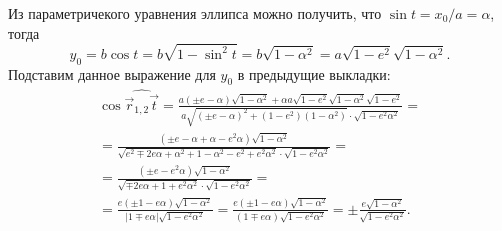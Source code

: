 Из параметричекого уравнения эллипса можно получить, что $\sin t = x_0/a = \alpha$, тогда
\begin{equation*}
	y_0 = b \cos t = b \sqrt{1 - \sin^2 t} = b \sqrt{1 - \alpha^2} = a \sqrt{1 - e^2} \sqrt{1 - \alpha^2}.
\end{equation*}
Подставим данное выражение для $y_0$ в предыдущие выкладки:
\begin{multline*}
	\cos \widehat{\vec r_{1, 2}  \vec t}
	= \frac{a ( \pm e - \alpha) \sqrt{1 - \alpha^2} + \alpha a \sqrt{1 - e^2} \sqrt{1 - \alpha^2} \sqrt{1 - e^2}}{a \sqrt{(\pm e - \alpha)^2 + (1 - e^2)(1 - \alpha^2)} \cdot \sqrt{1 - e^2 \alpha^2}} = \\
	= \frac{ (\pm e - \alpha + \alpha - e^2 \alpha) \sqrt{1 - \alpha^2}}{\sqrt{e^2 \mp 2 e\alpha + \alpha^2 + 1 - \alpha^2 - e^2 + e^2 \alpha^2} \cdot \sqrt{1 - e^2 \alpha^2}} = \\
	= \frac{ (\pm e - e^2 \alpha) \sqrt{1 - \alpha^2}}{\sqrt{\mp 2 e\alpha + 1  + e^2 \alpha^2} \cdot \sqrt{1 - e^2 \alpha^2}} = \\
	= \frac{ e(\pm 1 - e \alpha) \sqrt{1 - \alpha^2}}{|1 \mp e\alpha| \sqrt{1 - e^2 \alpha^2}}
	= \frac{ e(\pm 1 - e \alpha) \sqrt{1 - \alpha^2}}{(1 \mp e\alpha) \sqrt{1 - e^2 \alpha^2}}
	= \pm \frac{e \sqrt{1 - \alpha^2}}{\sqrt{1 - e^2 \alpha^2}}.
\end{multline*}

